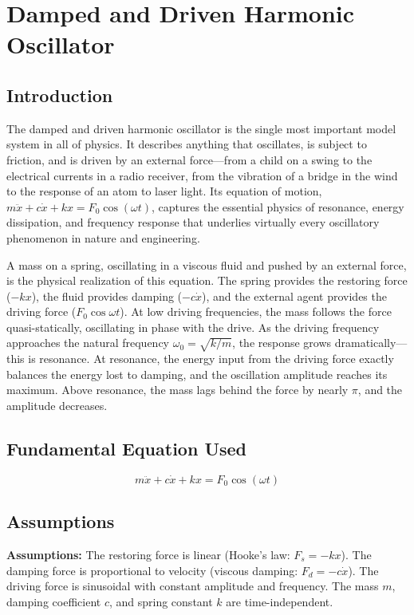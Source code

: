 \chapter{Damped and Driven Harmonic Oscillator}

\section*{Introduction}

The damped and driven harmonic oscillator is the single most important model system in all of physics. It describes anything that oscillates, is subject to friction, and is driven by an external force---from a child on a swing to the electrical currents in a radio receiver, from the vibration of a bridge in the wind to the response of an atom to laser light. Its equation of motion, $m\ddot{x} + c\dot{x} + kx = F_0\cos(\omega t)$, captures the essential physics of resonance, energy dissipation, and frequency response that underlies virtually every oscillatory phenomenon in nature and engineering.

A mass on a spring, oscillating in a viscous fluid and pushed by an external force, is the physical realization of this equation. The spring provides the restoring force ($-kx$), the fluid provides damping ($-c\dot{x}$), and the external agent provides the driving force ($F_0\cos\omega t$). At low driving frequencies, the mass follows the force quasi-statically, oscillating in phase with the drive. As the driving frequency approaches the natural frequency $\omega_0 = \sqrt{k/m}$, the response grows dramatically---this is resonance. At resonance, the energy input from the driving force exactly balances the energy lost to damping, and the oscillation amplitude reaches its maximum. Above resonance, the mass lags behind the force by nearly $\pi$, and the amplitude decreases.
\section*{Fundamental Equation Used}

\begin{equation}
m\ddot{x} + c\dot{x} + kx = F_0\cos(\omega t)
\end{equation}
\section*{Assumptions}

\textbf{Assumptions:} The restoring force is linear (Hooke's law: $F_s = -kx$). The damping force is proportional to velocity (viscous damping: $F_d = -c\dot{x}$). The driving force is sinusoidal with constant amplitude and frequency. The mass $m$, damping coefficient $c$, and spring constant $k$ are time-independent.



